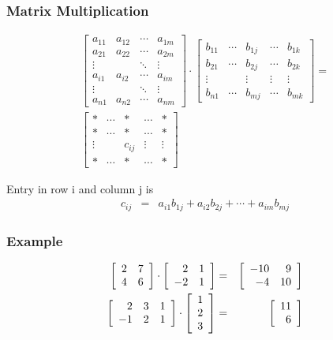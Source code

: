 \begin{frame}
  \frametitle{Matrix Multiplication}

  \begin{eqnarray*}
    \left[
    \begin{array}{rrrr}
      a_{11} & a_{12} & \cdots & a_{1m} \\
      a_{21} & a_{22} & \cdots & a_{2m} \\
      \vdots &       & \ddots & \vdots \\ \hline
      a_{i1} & a_{i2} & \cdots & a_{im} \\ \hline
      \vdots &       & \ddots & \vdots \\
      a_{n1} & a_{n2} & \cdots & a_{nm}
    \end{array}
  \right] \cdot
    \left[
    \begin{array}{rr|r|rr}
      b_{11} & \cdots & b_{1j} & \cdots  & b_{1k} \\
      b_{21} & \cdots & b_{2j} & \cdots  & b_{2k} \\
      \vdots &        & \vdots & \vdots & \vdots \\
      b_{n1} & \cdots & b_{mj}  & \cdots & b_{mk}
    \end{array}
  \right]  =  \\
    \left[
    \begin{array}{rrrrr}
      * & \cdots & * & \cdots  &  * \\
      *  & \cdots & *  & \cdots  &  * \\
      \vdots &        & c_{ij} & \vdots & \vdots \\
      * & \cdots & *  & \cdots & *
    \end{array}
  \right]
  \end{eqnarray*}

  Entry in row i and column j is 
  \begin{eqnarray*}
    c_{ij} & = & a_{i1}b_{1j} + a_{i2}b_{2j} + \cdots + a_{im}b_{mj}
  \end{eqnarray*}

\end{frame}


\begin{frame}
  \frametitle{Example}

  \begin{eqnarray*}
    \left[ \begin{array}{rr} 2 & 7 \\ 4 & 6 \end{array} \right] \cdot \left[ \begin{array}{rr} 2 & 1 \\ -2 & 1 \end{array} \right] & = & 
    \left[ \begin{array}{rr} -10 & 9 \\ -4 & 10 \end{array} \right] \\
    \left[
      \begin{array}{rrr}
        2 & 3 & 1 \\ -1 & 2 & 1
      \end{array}
    \right] \cdot
    \left[
      \begin{array}{r}
        1 \\ 2 \\ 3
      \end{array}
    \right]
    & = & 
    \left[ \begin{array}{r} 11 \\ 6 \end{array} \right]
  \end{eqnarray*}

\end{frame}

